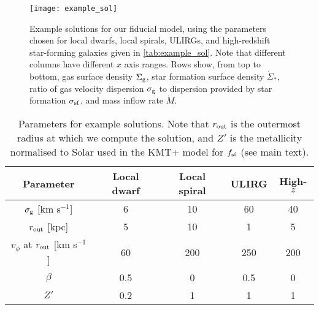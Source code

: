 \documentclass[useAMS,usenatbib]{mn2e}
\begin{document}
\begin{figure*}
\texttt{[image: example\_sol]}
\caption{
\label{fig:example_sol}
Example solutions for our fiducial model, using the parameters chosen for local dwarfs, local spirals, ULIRGs, and high-redshift star-forming galaxies given in \autoref{tab:example_sol}. Note that different columns have different $x$ axis ranges. Rows show, from top to bottom, gas surface density $\Sigma_{\rm g}$, star formation surface density $\dot{\Sigma}_*$, ratio of gas velocity dispersion $\sigma_{\rm g}$ to dispersion provided by star formation $\sigma_{\rm sf}$, and mass inflow rate $\dot{M}$.
}
\end{figure*}

\begin{table}
\begin{tabular}{c@{$\quad$}cccc}
\hline
Parameter & Local dwarf & Local spiral & ULIRG & High-$z$ \\
\hline
$\sigma_{\rm g}$ [km s$^{-1}$] & 6 & 10 & 60 & 40 \\
$r_{\rm out}$ [kpc] & 5 & 10 & 1 & 5 \\
$v_{\phi}$ at $r_{\rm out}$ [km s$^{-1}$] & 60 & 200 & 250 & 200 \\
$\beta$ & 0.5 & 0 & 0.5 & 0 \\
$Z'$ & 0.2 & 1 & 1 & 1 \\
\hline
\end{tabular}
\caption{
\label{tab:example_sol}
Parameters for example solutions. Note that $r_{\rm out}$ is the outermost radius at which we compute the solution, and $Z'$ is the metallicity normalised to Solar used in the KMT+ model for $f_{\rm sf}$ (see main text).
}
\end{table}
\end{document}
